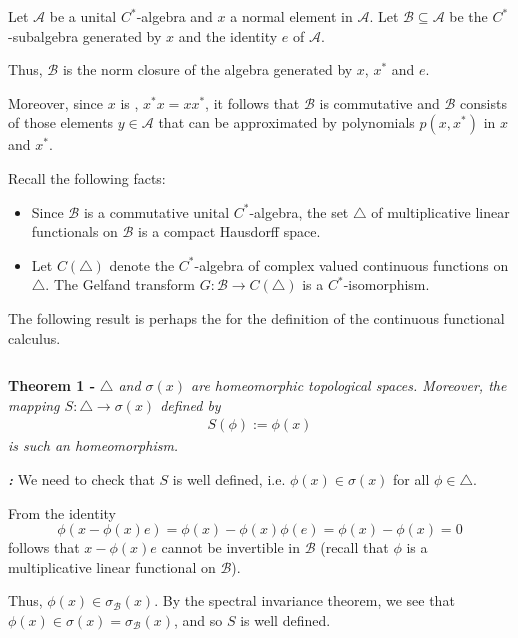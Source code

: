 \documentclass[12pt]{article}
\begin{document}
Let $\mathcal{A}$ be a unital $C^*$-algebra and $x$ a normal element in $\mathcal{A}$. Let $\mathcal{B} \subseteq \mathcal{A}$ be the $C^*$-subalgebra generated by $x$ and the identity $e$ of $\mathcal{A}$.

Thus, $\mathcal{B}$ is the norm closure of the algebra generated by $x$, $x^*$ and $e$.

Moreover, since $x$ is , $x^*x=xx^*$, it follows that $\mathcal{B}$ is commutative and $\mathcal{B}$ consists of those elements $y \in \mathcal{A}$ that can be approximated by polynomials $p(x,x^*)$ in $x$ and $x^*$.

Recall the following facts:
\begin{itemize}
\item Since $\mathcal{B}$ is a commutative unital $C^*$-algebra, the set $\bigtriangleup$ of multiplicative linear functionals on $\mathcal{B}$ is a compact Hausdorff space.
 
\item Let $C(\bigtriangleup)$ denote the $C^*$-algebra of complex valued continuous functions on $\bigtriangleup$. The Gelfand transform $G : \mathcal{B} \longrightarrow C(\bigtriangleup)$ is a $C^*$-isomorphism.
\end{itemize}

The following result is perhaps the  for the definition of the continuous functional calculus.

$\,$

{\bf Theorem 1 -} \emph{$\bigtriangleup$ and $\sigma(x)$ are homeomorphic topological spaces. Moreover, the mapping $S: \bigtriangleup \to \sigma(x)$ defined by}
\begin{align*}
S(\phi):= \phi(x)
\end{align*}
\emph{is such an homeomorphism.}


{\bf \emph{ :}} We need to check that $S$ is well defined, i.e. $\phi(x) \in \sigma(x)$ for all $\phi \in \bigtriangleup$.

From the identity
\begin{displaymath}
\phi(x-\phi(x)e) = \phi(x)-\phi(x)\phi(e) = \phi(x)-\phi(x)=0
\end{displaymath}
follows that $x-\phi(x)e$ cannot be invertible in $\mathcal{B}$ (recall that $\phi$ is a multiplicative linear functional on $\mathcal{B}$).

Thus, $\phi(x) \in \sigma_{\mathcal{B}}(x)$. By the spectral invariance theorem, we see that $\phi(x) \in \sigma(x) = \sigma_{\mathcal{B}}(x)$, and so $S$ is well defined.
\end{document}
